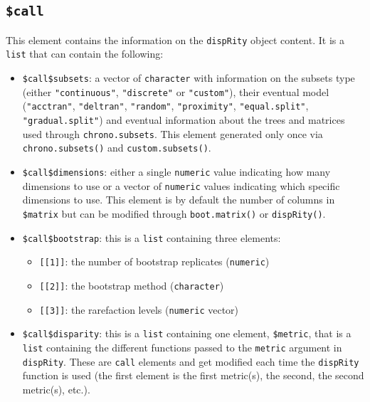 \documentclass[]{book}
\providecommand{\tightlist}{%
  \setlength{\itemsep}{0pt}\setlength{\parskip}{0pt}}
\begin{document}
\hypertarget{call}{%
\subsection{\texorpdfstring{\texttt{\$call}}{\$call}}\label{call}}

This element contains the information on the \texttt{dispRity} object content.
It is a \texttt{list} that can contain the following:

\begin{itemize}
\tightlist
\item
  \texttt{\$call\$subsets}: a vector of \texttt{character} with information on the subsets type (either \texttt{"continuous"}, \texttt{"discrete"} or \texttt{"custom"}), their eventual model (\texttt{"acctran"}, \texttt{"deltran"}, \texttt{"random"}, \texttt{"proximity"}, \texttt{"equal.split"}, \texttt{"gradual.split"}) and eventual information about the trees and matrices used through \texttt{chrono.subsets}. This element generated only once via \texttt{chrono.subsets()} and \texttt{custom.subsets()}.
\item
  \texttt{\$call\$dimensions}: either a single \texttt{numeric} value indicating how many dimensions to use or a vector of \texttt{numeric} values indicating which specific dimensions to use. This element is by default the number of columns in \texttt{\$matrix} but can be modified through \texttt{boot.matrix()} or \texttt{dispRity()}.
\item
  \texttt{\$call\$bootstrap}: this is a \texttt{list} containing three elements:

  \begin{itemize}
  \tightlist
  \item
    \texttt{{[}{[}1{]}{]}}: the number of bootstrap replicates (\texttt{numeric})
  \item
    \texttt{{[}{[}2{]}{]}}: the bootstrap method (\texttt{character})
  \item
    \texttt{{[}{[}3{]}{]}}: the rarefaction levels (\texttt{numeric} vector)
  \end{itemize}
\item
  \texttt{\$call\$disparity}: this is a \texttt{list} containing one element, \texttt{\$metric}, that is a \texttt{list} containing the different functions passed to the \texttt{metric} argument in \texttt{dispRity}. These are \texttt{call} elements and get modified each time the \texttt{dispRity} function is used (the first element is the first metric(s), the second, the second metric(s), etc.).
\end{itemize}
\end{document}
